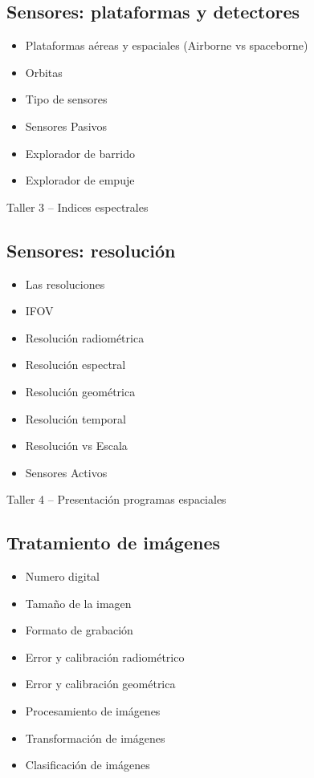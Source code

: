 \documentclass[a4paper,twoside,11pt,]{article}
\begin{document}
\subsection {Sensores: plataformas y detectores}
\begin{itemize}
\item Plataformas aéreas y espaciales (Airborne vs spaceborne)
\item Orbitas
\item Tipo de sensores
\item Sensores Pasivos
\item Explorador de barrido
\item Explorador de empuje
\end{itemize}

\begin{tcolorbox}[enhanced,width=5in,center upper,  fontupper=\large\bfseries,drop shadow southwest,sharp corners]
Taller 3 -- Indices espectrales
\end{tcolorbox}

\subsection {Sensores: resolución}
\begin{itemize}
\item Las resoluciones
\item IFOV
\item Resolución radiométrica
\item Resolución espectral
\item Resolución geométrica
\item Resolución temporal
\item Resolución vs Escala
\item Sensores Activos
\end{itemize}

\begin{tcolorbox}[enhanced,width=5in,center upper,  fontupper=\large\bfseries,drop shadow southwest,sharp corners]
Taller 4 -- Presentación programas espaciales
\end{tcolorbox}

\subsection {Tratamiento de imágenes}
\begin{itemize}
\item Numero digital
\item Tamaño de la imagen
\item Formato de grabación
\item Error y calibración radiométrico
\item Error y calibración geométrica
\item Procesamiento de imágenes
\item Transformación de imágenes
\item Clasificación de imágenes
\end{itemize}
\end{document}
